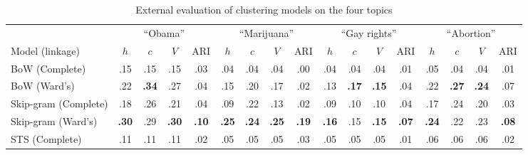 \begin{table}[t]
\begin{center}
{\footnotesize
\setlength{\tabcolsep}{0.5em}
\begin{tabular}{@{}l cccc cccc cccc cccc@{}}
\toprule
& \multicolumn{4}{c}{``Obama''} & \multicolumn{4}{c}{``Marijuana''} & \multicolumn{4}{c}{``Gay rights''} & \multicolumn{4}{c}{``Abortion''} \\
\cmidrule(lr){2-5}
\cmidrule(lr){6-9}
\cmidrule(lr){10-13}
\cmidrule(lr){14-17}
Model (linkage) &
$h$ & $c$ & $V$ & ARI &
$h$ & $c$ & $V$ & ARI &
$h$ & $c$ & $V$ & ARI &
$h$ & $c$ & $V$ & ARI \\
\midrule
BoW (Complete) &
.15 & .15 & .15 & .03 & 
.04 & .04 & .04 & .00 & 
.04 & .04 & .04 & .01 & 
.05 & .04 & .04 & .01\\
BoW (Ward's) & 
.22 & \textbf{.34} & .27 & .04 & 
.15 & .20 & .17 & .02 & 
.13 & \textbf{.17} & \textbf{.15} & .04 & 
.22 & \textbf{.27} & \textbf{.24} & .07 \\
Skip-gram (Complete) & 
.18 & .26 & .21 & .04 & 
.09 & .22 & .13 & .02 & 
.09 & .10 & .10 & .04 & 
.17 & .24 & .20 & .03  \\
Skip-gram (Ward's) & 
\textbf{.30} & .29 & \textbf{.30} & \textbf{.10} & 
\textbf{.25} & \textbf{.24} & \textbf{.25} & \textbf{.19} & 
\textbf{.16} & .15 & \textbf{.15} & \textbf{.07} & 
\textbf{.24} & .22 & .23 & \textbf{.08} \\
STS (Complete) & .11 & .11 & .11 & .02 & .05 & .05 & .05 & .03	& .05 & .05 & .05 & .01 & .06 & .06 & .06 & .02

 \\
\bottomrule
\end{tabular}}
\caption{External evaluation of clustering models on the four topics}
\label{tab:external-eval}
\end{center}
\end{table}

